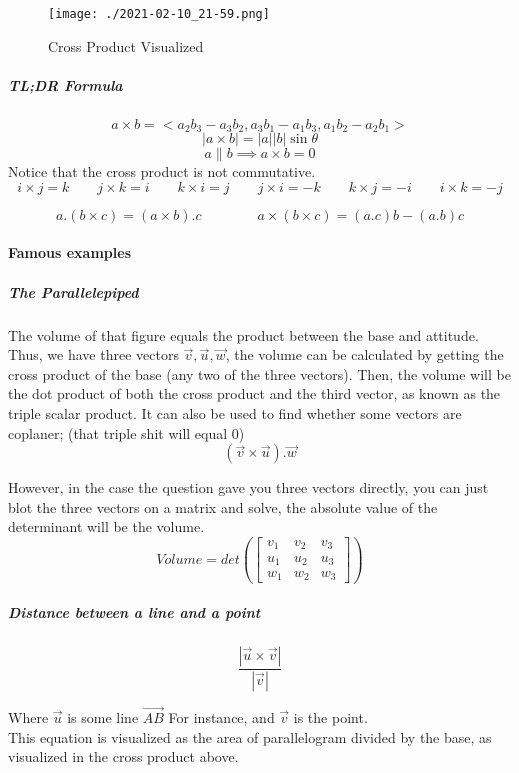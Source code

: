 \documentclass{article}
\begin{document}
\begin{figure}[h!]
	\texttt{[image: ./2021-02-10\_21-59.png]}
	\caption{Cross Product Visualized}
\end{figure}

\subparagraph{TL;DR Formula}
\[
	a\times b = <a_2b_3-a_3b_2,a_3b_1-a_1b_3,a_1b_2-a_2b_1> 
\]
\[
	|a\times b|
	= |a||b| \sin{ \theta } 
\]
\[
	a \parallel b \implies a \times b = 0 
\]
Notice that the cross product is not commutative.
\[
	i \times j = k  \qquad j \times k = i \qquad k \times i = j \qquad j \times i = -k \qquad k \times j = -i \qquad i \times k = -j 
\]

\[
	a . (b \times c) = (a \times b) . c \qquad \qquad a \times (b \times c ) = (a.c)b - (a.b)c 
\]

\newpage

\paragraph{Famous examples}
\subparagraph{The Parallelepiped}
The volume of that figure equals the product between the base and attitude. Thus, we have three vectors $ \vec{ v }, \vec{ u }, \vec{ w } $, the volume can be calculated by getting the cross product of the base (any two of the three vectors). Then, the volume will be the dot product of both the cross product and the third vector, as known as the triple scalar product.
It can also be used to find whether some vectors are coplaner; (that triple shit will equal 0)
\begin{equation*}
	( \vec{ v } \times \vec{ u } ) . \vec{ w }
\end{equation*}

However, in the case the question gave you three vectors directly, you can just blot the three vectors on a matrix and solve, the absolute value of the determinant will be the volume.
\begin{equation*}
	Volume = det \left( \left [
		\begin{matrix}
			v_1&v_2&v_3\\u_1&u_2&u_3\\w_1&w_2&w_3
		\end{matrix}
		\right]
	\right)
\end{equation*}

\subparagraph{Distance between a line and a point}
\[
	\frac{| \vec{ u } \times \vec{ v }| }{ | \vec{ v } | } 
\]

Where $\vec{ u }$ is some line $ \vec{ AB } $ For instance, and $\vec{ v }$ is the point. \\ 
This equation is visualized as the area of parallelogram divided by the base, as visualized in the cross product above.
\\
\newpage
\end{document}
